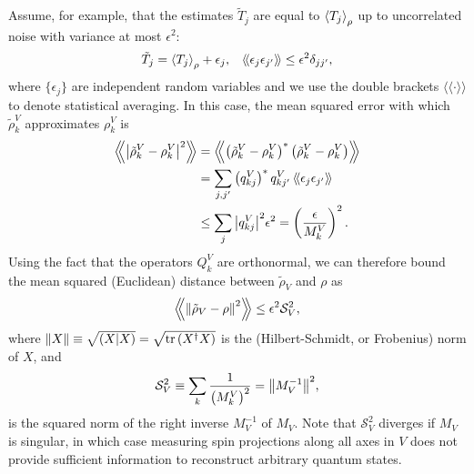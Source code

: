 \documentclass[notitlepage,twocolumn]{revtex4-2}
\newcommand{\f}[2]{\dfrac{#1}{#2}} %
\newcommand{\p}[1]{\left(#1\right)} %
\newcommand{\bk}{\Braket} %
\renewcommand{\set}[1]{\{#1\}} %
\newcommand{\bbk}[1]{\langle\!\langle #1 \rangle\!\rangle}
\newcommand{\Bbk}[1]
{\left\langle\!\!\left\langle #1 \right\rangle\!\!\right\rangle}
\renewcommand{\S}{\mathcal{S}}
\def\obk#1{\mathinner{({#1})}}
\begin{document}
Assume, for example, that the estimates $\tilde T_j$ are equal to $\bk{T_j}_\rho$ up to uncorrelated noise with variance at most $\epsilon^2$:
\begin{align}
  \tilde T_j = \bk{T_j}_\rho + \epsilon_j,
  &&
  \bbk{\epsilon_j \epsilon_{j'}} \le \epsilon^2 \delta_{jj'},
  \label{eq:error_assumption}
\end{align}
where $\set{\epsilon_j}$ are independent random variables and we use the double brackets $\bbk{\cdot}$ to denote statistical averaging.
In this case, the mean squared error with which $\tilde\rho^V_k$ approximates $\rho^V_k$ is
\begin{align}
  \Bbk{\abs{\tilde\rho^V_k-\rho^V_k}^2}
  &= \Bbk{\p{\tilde\rho^V_k-\rho^V_k}^*\p{\tilde\rho^V_k-\rho^V_k}} \\
  &= \sum_{j,j'} \p{q^V_{kj}}^* q^V_{kj'}\,
  \bbk{\epsilon_j \epsilon_{j'}} \\
  &\le \sum_j \abs{q^V_{kj}}^2 \epsilon^2
  = \p{\f{\epsilon}{M^V_k}}^2.
\end{align}
Using the fact that the operators $Q^V_k$ are orthonormal, we can therefore bound the mean squared (Euclidean) distance between $\tilde\rho_V$ and $\rho$ as
\begin{align}
  \Bbk{\norm{\tilde\rho_V-\rho}^2}
  \le \epsilon^2 \S_V^2,
  \label{eq:bound_eps}
\end{align}
where $\norm{X} \equiv \sqrt{\obk{X|X}} = \sqrt{\tr\p{X^\dag X}}$ is the (Hilbert-Schmidt, or Frobenius) norm of $X$, and
\begin{align}
  \S_V^2 \equiv \sum_k\f1{\p{M^V_k}^2} = \norm{M_V^{-1}}^2,
\end{align}
is the squared norm of the right inverse $M_V^{-1}$ of $M_V$.
Note that $\S_V^2$ diverges if $M_V$ is singular, in which case measuring spin projections along all axes in $V$ does not provide sufficient information to reconstruct arbitrary quantum states.
\end{document}
